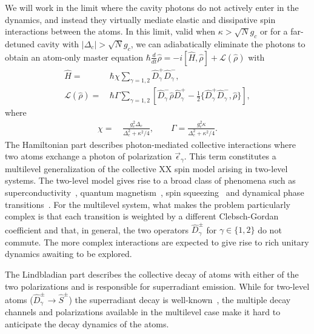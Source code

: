\documentclass[aps,prx,superscriptaddress,twocolumn,notitlepage,nofootinbib,longbibliography]{revtex4-2}
\begin{document}
We will work in the limit where the cavity photons do not actively enter in the dynamics, and instead they virtually mediate elastic and dissipative spin interactions between the atoms. In this limit, valid when $\kappa> \sqrt{N} g_c$ or for a far-detuned cavity with $|\Delta_c|> \sqrt{N}g_c$, we can adiabatically eliminate the photons to obtain an
atom-only master equation $\hbar\frac{d}{dt}\hat{\rho}= -i [\hat{H},\hat{\rho}] + \mathcal{L}(\hat{\rho})$ with
\begin{align}
	\hat{H} =&\, \hbar \chi \sum_{\gamma=1,2} \hat{D}^+_\gamma \hat{D}^-_\gamma,
\label{eq:H_2pol}\\
	\mathcal{L}(\hat\rho) =&\, \hbar\Gamma \sum_{\gamma=1,2} \left[ \hat{D}^-_\gamma \hat\rho \hat{D}^+_\gamma - \frac{1}{2} \{ \hat{D}^+_\gamma \hat{D}^-_\gamma, \hat\rho \} \right],
\label{eq:L_2pol}
\end{align}
where
\begin{align}
    \chi =&\, \frac{g_c^2 \Delta_c}{\Delta_c^2 + \kappa^2/4}, \qquad
    \Gamma = \frac{g_c^2 \kappa}{\Delta_c^2 + \kappa^2/4}.
\label{eq:chi_Gamma}
\end{align}
The Hamiltonian part describes photon-mediated collective interactions where two atoms exchange a photon of polarization $\vec{\epsilon}_\gamma$. This term constitutes
a multilevel generalization of the collective XX spin model arising in  two-level systems. The two-level model gives rise to a broad class of phenomena such as superconductivity~\cite{LewisSwan2021}, quantum magnetism~\cite{ThompsonNorcia_Science2018}, spin squeezing~\cite{Barberena2019,Tucker2020,LewisSwan2018,Hu2017} and dynamical phase transitions~\cite{ThompsonMuniz_Arxiv2019}.
For the multilevel system, what makes the problem particularly complex is that each transition is weighted by a different Clebsch-Gordan coefficient and that, in general, the two operators $\hat{D}^\pm_\gamma$ for $\gamma\in\{1,2\}$ do not commute. 
The more complex interactions are expected to give rise to rich unitary dynamics awaiting to be explored.

The Lindbladian part describes the collective decay of atoms with either of the two polarizations and is responsible for superradiant emission. While for two-level atoms ($\hat{D}^\pm_\gamma \rightarrow \hat{S}^\pm$) the superradiant decay is well-known~\cite{GrossHarocheSuperr}, the multiple decay channels and polarizations available in the multilevel case make it hard to anticipate the decay dynamics of the atoms.
\end{document}
